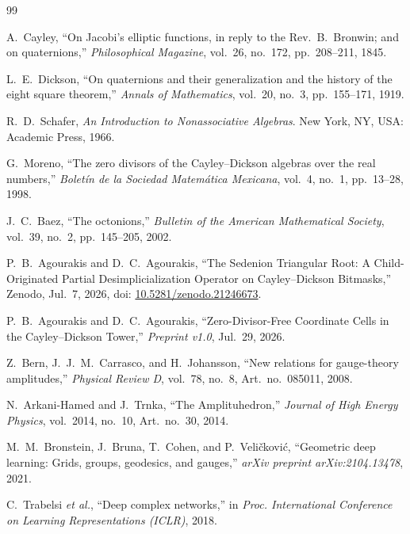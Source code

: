 \documentclass[11pt,a4paper]{article}
\theoremstyle{definition}
\theoremstyle{remark}
\begin{document}
\begin{thebibliography}{99}

A.~Cayley, ``On Jacobi's elliptic functions, in reply to the Rev.~B.~Bronwin; and on quaternions,'' \emph{Philosophical Magazine}, vol.~26, no.~172, pp.~208--211, 1845.

L.~E.~Dickson, ``On quaternions and their generalization and the history of the eight square theorem,'' \emph{Annals of Mathematics}, vol.~20, no.~3, pp.~155--171, 1919.

R.~D.~Schafer, \emph{An Introduction to Nonassociative Algebras}. New York, NY, USA: Academic Press, 1966.

G.~Moreno, ``The zero divisors of the Cayley--Dickson algebras over the real numbers,'' \emph{Bolet\'in de la Sociedad Matem\'atica Mexicana}, vol.~4, no.~1, pp.~13--28, 1998.

J.~C.~Baez, ``The octonions,'' \emph{Bulletin of the American Mathematical Society}, vol.~39, no.~2, pp.~145--205, 2002.

P.~B.~Agourakis and D.~C.~Agourakis, ``The Sedenion Triangular Root: A Child-Originated Partial Desimplicialization Operator on Cayley--Dickson Bitmasks,'' Zenodo, Jul.\ 7, 2026, doi: \href{https://doi.org/10.5281/zenodo.21246673}{10.5281/zenodo.21246673}.

P.~B.~Agourakis and D.~C.~Agourakis, ``Zero-Divisor-Free Coordinate Cells in the Cayley--Dickson Tower,'' \emph{Preprint v1.0}, Jul.\ 29, 2026.

Z.~Bern, J.~J.~M.~Carrasco, and H.~Johansson, ``New relations for gauge-theory amplitudes,'' \emph{Physical Review D}, vol.~78, no.~8, Art.~no.~085011, 2008.

N.~Arkani-Hamed and J.~Trnka, ``The Amplituhedron,'' \emph{Journal of High Energy Physics}, vol.~2014, no.~10, Art.~no.~30, 2014.

M.~M.~Bronstein, J.~Bruna, T.~Cohen, and P.~Veli\v{c}kovi\'c, ``Geometric deep learning: Grids, groups, geodesics, and gauges,'' \emph{arXiv preprint arXiv:2104.13478}, 2021.

C.~Trabelsi \emph{et al.}, ``Deep complex networks,'' in \emph{Proc. International Conference on Learning Representations (ICLR)}, 2018.


\end{thebibliography}
\end{document}
